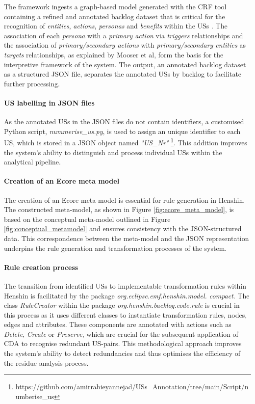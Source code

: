 The framework ingests a graph-based model generated with the CRF tool containing a refined and annotated backlog dataset that is critical for the recognition of \textit{entities}, \textit{actions}, \textit{personas} and \textit{benefits} within the USs \cite{mosser2022modelling}. The association of each \textit{persona} with a \textit{primary action} via \textit{triggers} relationships and the association of \textit{primary/secondary actions} with \textit{primary/secondary entities} as \textit{targets} relationships, as explained by Mooser et al, form the basis for the interpretive framework of the system\cite{arulmohan2023extracting}. The output, an annotated backlog dataset as a structured JSON file, separates the annotated USs by backlog to facilitate further processing.

\paragraph{US labelling in JSON files}\label{workflow_nummerize_us}
As the annotated USs in the JSON files do not contain identifiers, a customised Python script, \textit{nummerise\_us.py}, is used to assign an unique identifier to each US, which is stored in a JSON object named \textit{"US\_Nr"} \footnote{https://github.com/amirrabieyannejad/USs\_Annotation/tree/main/Script/numberise\_us}. This addition improves the system's ability to distinguish and process individual USs within the analytical pipeline.

\paragraph{Creation of an Ecore meta model}\label{workflow_ecore}
The creation of an Ecore meta-model is essential for rule generation in Henshin. The constructed meta-model, as shown in Figure \ref{fig:ecore_meta_model}, is based on the conceptual meta-model outlined in Figure \ref{fig:conceptual_metamodel} and ensures consistency with the JSON-structured data. This correspondence between the meta-model and the JSON representation underpins the rule generation and transformation processes of the system.
\paragraph{Rule creation process}\label{workflow_rule_creator}
The transition from identified USs to implementable transformation rules within Henshin is facilitated by the package \textit{org.eclipse.emf.henshin.model. compact}. The class \textit{RuleCreator} within the package \textit{org.henshin.backlog.code.rule} is crucial in this process as it uses different classes to instantiate transformation rules, nodes, edges and attributes. These components are annotated with actions such as \textit{Delete}, \textit{Create} or \textit{Preserve}, which are crucial for the subsequent application of CDA to recognise redundant US-pairs. This methodological approach improves the system's ability to detect redundancies and thus optimises the efficiency of the residue analysis process.

